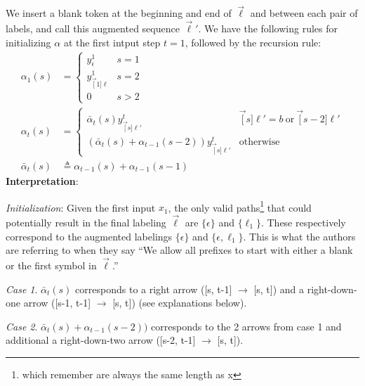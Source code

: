 \documentclass[11pt]{article}
\begin{document}
\p We insert a blank token at the beginning and end of $\vec\ell$ and between each pair of labels, and call this augmented sequence $\vec{\ell}'$. We have the following rules for initializing $\alpha$ at the first intput step $t{=}1$, followed by the recursion rule:
\begin{align}
\alpha_1(s) &= \begin{cases}
y_{\epsilon}^1 & s{=}1 \\
y_{ \vec[1]{\ell} }^1 & s{=}2 \\
0 & s > 2
\end{cases}\\
\alpha_t(s)
&= \begin{cases}
\bar{\alpha}_t(s) y_{\vec[s]{\ell}' }^t 	& \vec[s]{\ell}' {=} b ~ \text{or} ~ \vec[s-2]{\ell}'  \\
( \bar{\alpha}_t(s) + \alpha_{t-1}(s -2) ) y_{\vec[s]{\ell}' }^t  							& \text{otherwise}
\end{cases}\\
\bar{\alpha}_t(s)
&\triangleq \alpha_{t-1}(s) + \alpha_{t-1}(s - 1)
\end{align}
\textbf{Interpretation}:
\begin{compactitem}
	\item \textit{Initialization}: Given the first input $x_1$, the only valid paths\footnote{which remember are always the same length as x} that could potentially result in the final labeling $\vec\ell$ are $\{\epsilon \}$ and $\{\ell_1\}$.  These respectively correspond to the augmented labelings $\{\epsilon\}$ and $\{\epsilon, \ell_1\}$. This is what the authors are referring to when they say ``We allow all prefixes to start with either a blank or the first symbol in $\vec\ell$.''
	
	\item \textit{Case 1}. $\bar{\alpha}_t(s) $ corresponds to a right arrow ([s, t-1] $\rightarrow$ [s, t]) and a right-down-one arrow ([s-1, t-1] $\rightarrow$ [s, t]) (see explanations below). 
	
	\item \textit{Case 2}. $\bar{\alpha}_t(s) + \alpha_{t-1}(s -2) )$ corresponds to the 2 arrows from case 1 and additional a right-down-two arrow ([s-2, t-1] $\rightarrow$ [s, t]). 
\end{compactitem}
\end{document}

